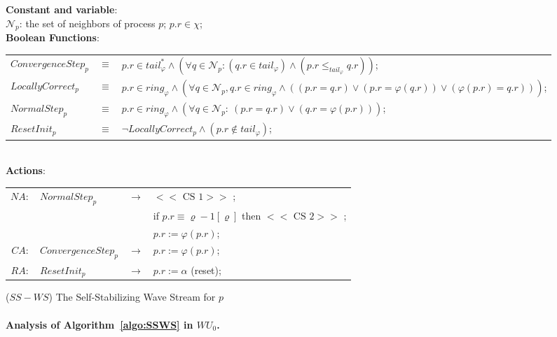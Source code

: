\documentclass[11pt]{article}
\newcommand{\mN}   {\mathcal{N}}
\begin{document}
\begin{algorithm}
\begin{footnotesize}
\noindent
{\bf Constant and variable}:\\
\hspace*{0.3cm}
$\mN_p$: the set of neighbors of process $p$; $p.r \in \chi $;\\
\noindent
{\bf Boolean Functions}:\\
\noindent
\hspace*{0.3cm}
\begin{tabular}{@{}lcl}
$ConvergenceStep_p$&$\equiv$ &$p.r \in tail_{\varphi }^{*}\wedge (\forall q\in \mN_p:(q.r \in tail_{\varphi })\wedge (p.r\leq _{tail_{\varphi }}q.r))$;\\
$LocallyCorrect_p$ &$\equiv$ & $p.r \in ring_{\varphi}\wedge (\forall q\in \mN_p,q.r \in ring_{\varphi}\wedge ( \left( p.r=q.r\right) \vee \left( p.r=\varphi \left(
q.r\right) \right) \vee \left( \varphi \left( p.r\right) =q.r\right) ))$;\\
$NormalStep_p$ &$\equiv$ & $p.r \in ring_{\varphi}\wedge (\forall q \in \mN_p:\ (p.r=q.r)\vee (q.r =\varphi (p.r)))$;\\
$ResetInit_p $ &$\equiv$ &
      $\neg LocallyCorrect_p\wedge (p.r \not\in tail_\varphi)$;\\
\end{tabular}\\
{\bf Actions}:\\
\noindent
\hspace*{0.3cm}
\begin{tabular}{@{}rlcl}
$NA:$ &  $NormalStep_p$ & $\longrightarrow$ & $<<\mbox{ CS 1}>>$ ; \\
   &&& if $p.r\equiv \varrho -1 [\varrho ]$ then $ <<\mbox{ CS 2}>>$ ;\\
   &&&  $p.r := \varphi(p.r)$;\\

   
$CA:$ & $ConvergenceStep_p$ & $\longrightarrow$ &
   $p.r := \varphi(p.r)$;\\
$RA:$ & $ResetInit_p$ & $\longrightarrow$ &
   $p.r := \alpha$ (reset);\\  
   

\end{tabular}
\end{footnotesize}
\caption{($SS-WS$) The Self-Stabilizing Wave Stream  for $p$}
\label{algo:SSWS}
\end{algorithm}


\paragraph{Analysis of Algorithm~\ref{algo:SSWS} in $WU_0$.}
\label{sec:Unison_analysis}
\end{document}
